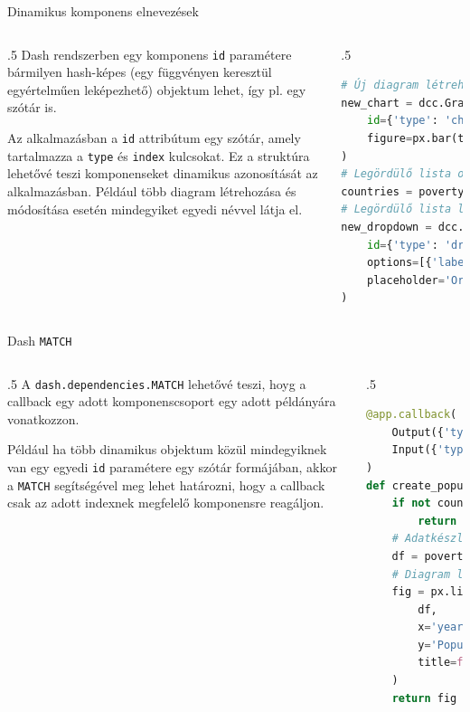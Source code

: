 \documentclass[english, aspectratio=169]{beamer}
\begin{document}
	\begin{frame}[fragile]{Dinamikus komponens elnevezések}
		\begin{columns}
			\begin{column}{.5\textwidth}
				Dash rendszerben egy komponens \texttt{id} paramétere bármilyen hash-képes (egy függvényen keresztül egyértelműen leképezhető) objektum lehet, így pl. egy szótár is.\par\smallskip
				Az alkalmazásban a \texttt{id} attribútum egy szótár, amely tartalmazza a \texttt{type} és \texttt{index} kulcsokat. Ez a struktúra lehetővé teszi komponenseket dinamikus azonosítását az alkalmazásban. Például több diagram létrehozása és módosítása esetén mindegyiket egyedi névvel látja el.  
			\end{column}
			\begin{column}{.5\textwidth}
				\begin{lstlisting}[language=python]
# Új diagram létrehozása
new_chart = dcc.Graph(
	id={'type': 'chart', 'index': n_clicks},
	figure=px.bar(title=f"Diagram {n_clicks}")
)
# Legördülő lista opciók létrehozása
countries = poverty[poverty['is_country']]['Country Name'].drop_duplicates().sort_values()
# Legördülő lista létrehozása
new_dropdown = dcc.Dropdown(
	id={'type': 'dropdown', 'index': n_clicks},
	options=[{'label': c, 'value': c} for c in countries],
	placeholder='Ország kiválasztása'
)
				\end{lstlisting}
			\end{column}
		\end{columns}
	\end{frame}
	
	\begin{frame}[fragile]{Dash \texttt{MATCH}}
		\begin{columns}
			\begin{column}{.5\textwidth}
				A \texttt{dash.dependencies.MATCH} lehetővé teszi, hoyg a callback egy adott komponenscsoport egy adott példányára vonatkozzon.\par\medskip
				Például ha több dinamikus objektum közül mindegyiknek van egy egyedi \texttt{id} paramétere egy szótár formájában, akkor a \texttt{MATCH} segítségével meg lehet határozni, hogy a callback csak az adott indexnek megfelelő komponensre reagáljon.
			\end{column}
			\begin{column}{.5\textwidth}
				\begin{lstlisting}[language=python]
@app.callback(
	Output({'type': 'chart', 'index': MATCH}, 'figure'),
	Input({'type': 'dropdown', 'index': MATCH}, 'value'),
)
def create_population_chart(country):
	if not country:
		return no_update
	# Adatkészlet szűrése
	df = poverty[poverty['Country Name'] == country]
	# Diagram létrehozása
	fig = px.line(
		df,
		x='year',
		y='Population, total',
		title=f'{country} ország népessége'
	)
	return fig
				\end{lstlisting}
			\end{column}
		\end{columns}
	\end{frame}
	
\end{document}
